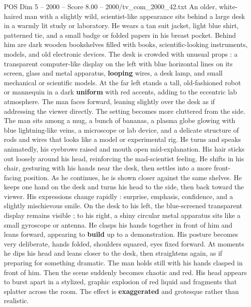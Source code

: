 \begin{textsample}{POS Dim 5 – 2000 – Score 8.00 – 2000/tv\_com\_2000\_42.txt}  \label{ex:f5_pos_027}
An older, white-haired man with a slightly wild, scientist-like appearance sits behind a large desk in a warmly lit study or laboratory.
He wears a tan suit jacket, light blue shirt, patterned tie, and a small badge or folded papers in his breast pocket.
Behind him are dark wooden bookshelves filled with books, scientific-looking instruments, models, and old electronic devices.
The desk is crowded with unusual props : a transparent computer-like display on the left with blue horizontal lines on its screen, glass and metal apparatus, \textbf{looping} wires, a desk lamp, and small mechanical or scientific models.
At the far left stands a tall, old-fashioned robot or mannequin in a dark \textbf{uniform} with red accents, adding to the eccentric lab atmosphere.
The man faces forward, leaning slightly over the desk as if addressing the viewer directly.
The setting becomes more cluttered from the side.
The man sits among a mug, a bunch of bananas, a plasma globe glowing with blue lightning-like veins, a microscope or lab device, and a delicate structure of rods and wires that looks like a model or experimental rig.
He turns and speaks animatedly, his eyebrows raised and mouth open mid-explanation.
His hair sticks out loosely around his head, reinforcing the mad-scientist feeling.
He shifts in his chair, gesturing with his hands near the desk, then settles into a more front-facing position.
As he continues, he is shown closer against the same shelves.
He keeps one hand on the desk and turns his head to the side, then back toward the viewer.
His expressions change rapidly : surprise, emphasis, confidence, and a slightly mischievous smile.
On the desk to his left, the blue-screened transparent display remains visible ; to his right, a shiny circular metal apparatus sits like a small gyroscope or antenna.
He clasps his hands together in front of him and leans forward, appearing to \textbf{build} up to a demonstration.
His posture becomes very deliberate, hands folded, shoulders squared, eyes fixed forward.
At moments he dips his head and leans closer to the desk, then straightens again, as if preparing for something dramatic.
The man holds still with his hands clasped in front of him.
Then the scene suddenly becomes chaotic and red.
His head appears to burst apart in a stylized, graphic explosion of red liquid and fragments that splatter across the room.
The effect is \textbf{exaggerated} and grotesque rather than realistic.

\end{textsample}
